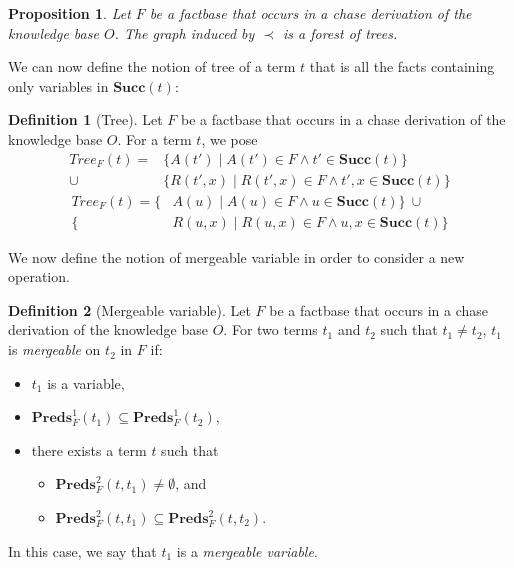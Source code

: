 \documentclass{article}
\newtheorem{proposition}{Proposition}[section]
\theoremstyle{definition}
\newtheorem{definition}{Definition}[section]
\theoremstyle{remark}
\newcommand{\Preds}{\textbf{Preds}}
\newcommand{\Tree}{\textit{Tree}}
\newcommand{\su}{\textbf{Succ}}
\begin{document}
\begin{proposition}
Let $F$ be a factbase that occurs in a chase derivation of the knowledge base $O$. The graph induced by $\prec$ is a forest of trees.
\end{proposition}

We can now define the notion of tree of a term $t$ that is all the facts containing only variables in $\su(t)$:

\begin{definition}[Tree]
Let $F$ be a factbase that occurs in a chase derivation of the knowledge base $O$. For a term $t$, we pose 
\begin{align*}
\Tree_{F}(t) = &\{A(t') \mid A(t') \in F \wedge t' \in \su(t)\} \\
 \cup &\{R(t',x) \mid R(t',x) \in F \wedge t',x \in \su(t)\}
\end{align*}
\begin{align*}
	\Tree_{F}(t) = \{&A(u) \mid A(u) \in F \wedge u \in \su(t)\}~\cup \\
	\{&R(u,x) \mid R(u,x) \in F \wedge u,x \in \su(t)\}
\end{align*}
\end{definition}


%

We now define the notion of mergeable variable in order to consider a new operation.

\begin{definition}[Mergeable variable]
Let $F$ be a factbase that occurs in a chase derivation of the knowledge base $O$. For two terms $t_1$ and $t_2$ such that $t_1 \neq t_2$, $t_1$ is \emph{mergeable} on $t_2$ in $F$ if:
\begin{itemize}
\item $t_1$ is a variable,
\item $\Preds_{F}^1(t_1) \subseteq \Preds_{F}^1(t_2)$,
\item there exists a term $t$ such that
	\begin{itemize}
	\item $\Preds^2_{F}(t,t_1) \neq \emptyset$, and
	\item $\Preds_{F}^2(t,t_1) \subseteq \Preds_{F}^2(t,t_2)$.
	\end{itemize}
\end{itemize}
In this case, we say that $t_1$ is a \emph{mergeable variable}.
\end{definition}
\end{document}
